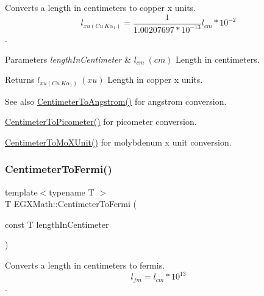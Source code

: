 Converts a length in centimeters to copper x units. \[ l_{xu(Cu\ K\alpha_1)}= \frac{1}{1.00207697*10^{-13}} l_{cm} * 10^{-2}\]. 


\begin{DoxyParams}{Parameters}
{\em length\+In\+Centimeter} & $ l_{cm}\ (cm)$ Length in centimeters. \\
\hline
\end{DoxyParams}
\begin{DoxyReturn}{Returns}
$ l_{xu(Cu\ K\alpha_1)}\ (xu)$ Length in copper x units. 
\end{DoxyReturn}
\begin{DoxySeeAlso}{See also}
\mbox{\hyperlink{group___e_g_x_math-_conversions-_length_conversions-_s_i-_centimeter-_non-_s_i_gacabf2b01cd8676ffb5ec8c70ecd621b6}{Centimeter\+To\+Angstrom()}} for angstrom conversion. 

\mbox{\hyperlink{group___e_g_x_math-_conversions-_length_conversions-_s_i-_centimeter-_s_i_ga7e2851b0052f1b135a84aa860495e4ba}{Centimeter\+To\+Picometer()}} for picometer conversion. 

\mbox{\hyperlink{group___e_g_x_math-_conversions-_length_conversions-_s_i-_centimeter-_non-_s_i_ga4e94aa6f1cc6aaeb751384a8472b01fd}{Centimeter\+To\+Mo\+X\+Unit()}} for molybdenum x unit conversion. 
\end{DoxySeeAlso}
\mbox{\label{group___e_g_x_math-_conversions-_length_conversions-_s_i-_centimeter-_non-_s_i_ga0b55e847f11e0ba8313d4556d23684dd}} 
\subsubsection{\texorpdfstring{Centimeter\+To\+Fermi()}{CentimeterToFermi()}}
{\footnotesize\ttfamily template$<$typename T $>$ \\
T E\+G\+X\+Math\+::\+Centimeter\+To\+Fermi (\begin{DoxyParamCaption}\item[{const T}]{length\+In\+Centimeter }\end{DoxyParamCaption})}



Converts a length in centimeters to fermis. \[ l_{fm}=l_{cm} * 10^{13} \]. 


